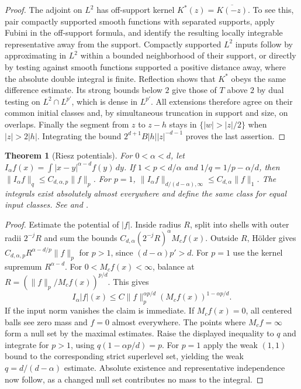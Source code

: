\documentclass[11pt,oneside,openany]{book}
\newtheorem{theorem}{Theorem}[chapter]
\theoremstyle{definition}
\theoremstyle{remark}
\begin{document}
\begin{proof}
The adjoint on \(L^2\) has off-support kernel \(K^*(z)=\overline{K(-z)}\). To see this, pair compactly supported smooth functions with separated supports, apply Fubini in the off-support formula, and identify the resulting locally integrable representative away from the support. Compactly supported \(L^2\) inputs follow by approximating in \(L^2\) within a bounded neighborhood of their support, or directly by testing against smooth functions supported a positive distance away, where the absolute double integral is finite. Reflection shows that \(K^*\) obeys the same difference estimate. Its strong bounds below \(2\) give those of \(T\) above \(2\) by dual testing on \(L^2\cap L^{p'}\), which is dense in \(L^{p'}\). All extensions therefore agree on their common initial classes and, by simultaneous truncation in support and size, on overlaps. Finally the segment from \(z\) to \(z-h\) stays in \(\{|w|>|z|/2\}\) when \(|z|>2|h|\). Integrating the bound \(2^{d+1}B|h||z|^{-d-1}\) proves the last assertion.
\end{proof}

\begin{theorem}[Riesz potentials]
\label{p102:U2-04}
For \(0<\alpha<d\), let \(I_\alpha f(x)=\int |x-y|^{\alpha-d}f(y)\,dy\). If \(1<p<d/\alpha\) and \(1/q=1/p-\alpha/d\), then \(\|I_\alpha f\|_q\le C_{d,\alpha,p}\|f\|_p\). For \(p=1\), \(\|I_\alpha f\|_{d/(d-\alpha),\infty}\le C_{d,\alpha}\|f\|_1\). The integrals exist absolutely almost everywhere and define the same class for equal input classes. See \cite[Chapter V, \S1]{stein} and \cite{hedberg}.
\end{theorem}
\begin{proof}
Estimate the potential of \(|f|\). Inside radius \(R\), split into shells with outer radii \(2^{-j}R\) and sum the bounds \(C_{d,\alpha}(2^{-j}R)^\alpha M_cf(x)\). Outside \(R\), Hölder gives \(C_{d,\alpha,p}R^{\alpha-d/p}\|f\|_p\) for \(p>1\), since \((d-\alpha)p'>d\). For \(p=1\) use the kernel supremum \(R^{\alpha-d}\). For \(0<M_cf(x)<\infty\), balance at \(R=(\|f\|_p/M_cf(x))^{p/d}\). This gives
\[
 I_\alpha |f|(x)\le C\|f\|_p^{\alpha p/d} (M_cf(x))^{1-\alpha p/d}.
\]
If the input norm vanishes the claim is immediate. If \(M_cf(x)=0\), all centered balls see zero mass and \(f=0\) almost everywhere. The points where \(M_cf=\infty\) form a null set by the maximal estimates. Raise the displayed inequality to \(q\) and integrate for \(p>1\), using \(q(1-\alpha p/d)=p\). For \(p=1\) apply the weak \((1,1)\) bound to the corresponding strict superlevel set, yielding the weak \(q=d/(d-\alpha)\) estimate. Absolute existence and representative independence now follow, as a changed null set contributes no mass to the integral.
\end{proof}
\end{document}

